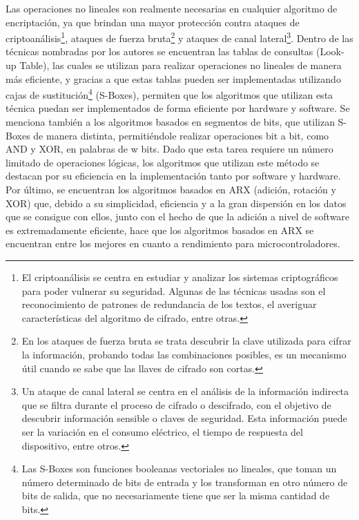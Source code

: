 \documentclass[a4paper,10pt]{article}
\begin{document}
	Las operaciones no lineales son realmente necesarias en cualquier algoritmo de encriptación, ya que brindan una mayor protección contra ataques de criptoanálisis\footnote{El criptoanálisis se centra en estudiar y analizar los sistemas criptográficos para poder vulnerar su seguridad. Algunas de las técnicas usadas son el reconocimiento de patrones de redundancia de los textos, el averiguar características del algoritmo de cifrado, entre otras.}, ataques de fuerza bruta\footnote{En los ataques de fuerza bruta se trata descubrir la clave utilizada para cifrar la información, probando todas las combinaciones posibles, es un mecanismo útil cuando se sabe que las llaves de cifrado son cortas.} y ataques de canal lateral\footnote{Un ataque de canal lateral se centra en el análisis de la información indirecta que se filtra durante el proceso de cifrado o descifrado, con el objetivo de descubrir información sensible o claves de seguridad. Esta información puede ser la variación en el consumo eléctrico, el tiempo de respuesta del dispositivo, entre otros.}. Dentro de las técnicas nombradas por los autores se encuentran las tablas de consultas (Look-up Table), las cuales se utilizan para realizar operaciones no lineales de manera más eficiente, y gracias a que estas tablas pueden ser implementadas utilizando cajas de sustitución\footnote{Las S-Boxes son funciones booleanas vectoriales no lineales, que toman un número determinado de bits de entrada y los transforman en otro número de bits de salida, que no necesariamente tiene que ser la misma cantidad de bits.} (S-Boxes), permiten que los algoritmos que utilizan esta técnica puedan ser implementados de forma eficiente por hardware y software. Se menciona también a los algoritmos basados en segmentos de bits, que utilizan S-Boxes de manera distinta, permitiéndole realizar operaciones bit a bit, como AND y XOR, en palabras de w bits. Dado que esta tarea requiere un número limitado de operaciones lógicas, los algoritmos que utilizan este método se destacan por su eficiencia en la implementación tanto por software y hardware. Por último, se encuentran los algoritmos basados en ARX (adición, rotación y XOR) que, debido a su simplicidad, eficiencia y a la gran dispersión en los datos que se consigue con ellos, junto con el hecho de que la adición a nivel de software es extremadamente eficiente, hace que los algoritmos basados en ARX se encuentran entre los mejores en cuanto a rendimiento para microcontroladores.
	
\end{document}
